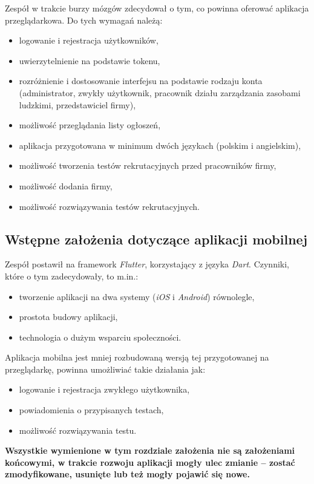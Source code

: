 \documentclass[twoside]{projektInzynierskiMS}
\numberwithin{figure}{section}
\begin{document}
Zespół w trakcie burzy mózgów zdecydował o tym, co powinna oferować aplikacja przeglądarkowa. Do tych wymagań należą:
\begin{itemize}
    \item logowanie i rejestracja użytkowników,
    \item uwierzytelnienie na podstawie tokenu,
    \item rozróżnienie i dostosowanie interfejsu na podstawie rodzaju konta (administrator, zwykły użytkownik, pracownik działu zarządzania zasobami ludzkimi, przedstawiciel firmy),
    \item możliwość przeglądania listy ogłoszeń,
    \item aplikacja przygotowana w minimum dwóch językach (polskim i angielskim),
    \item możliwość tworzenia testów rekrutacyjnych przed pracowników firmy,
    \item możliwość dodania firmy,
    \item możliwość rozwiązywania testów rekrutacyjnych.
\end{itemize}

\subsection{Wstępne założenia dotyczące aplikacji mobilnej}
Zespół postawił na framework \textit{Flutter}, korzystający z języka \textit{Dart}. Czynniki, które o tym zadecydowały, to m.in.: 
\begin{itemize}
    \item tworzenie aplikacji na dwa systemy (\textit{iOS} i \textit{Android}) równolegle,
    \item prostota budowy aplikacji,
    \item technologia o dużym wsparciu społeczności.
\end{itemize}

Aplikacja mobilna jest mniej rozbudowaną wersją tej przygotowanej na przeglądarkę, powinna umożliwiać takie działania jak:
\begin{itemize}
    \item logowanie i rejestracja zwykłego użytkownika,
    \item powiadomienia o przypisanych testach,
    \item możliwość rozwiązywania testu.
\end{itemize}
\textbf{Wszystkie wymienione w tym rozdziale założenia nie są założeniami końcowymi, w trakcie rozwoju aplikacji mogły ulec zmianie – zostać zmodyfikowane, usunięte lub też mogły pojawić się nowe.}
\end{document}
